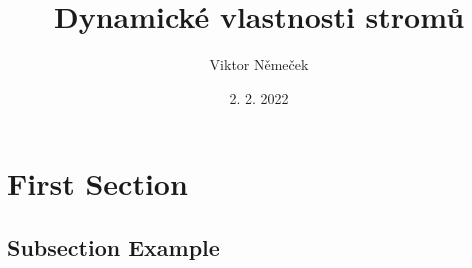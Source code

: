 \documentclass{beamer}
\title[Dynamické vlastnosti stromů]{Dynamické vlastnosti stromů} %
\author{Viktor Němeček} %
\institute[MFF UK] %
{
 \\ %
\medskip
\textit{} %
}
\date{2. 2. 2022} %
\begin{document}
\begin{frame}
\titlepage %
\end{frame}



\section{First Section} %

\subsection{Subsection Example} %


\end{document}

